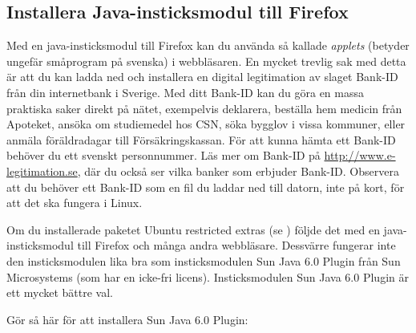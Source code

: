 \documentclass[a4paper,final]{memoir} %
\begin{document}


\subsection{Installera Java-insticksmodul till Firefox}

Med en java-insticksmodul till Firefox kan du använda så kallade \textit{applets} (betyder ungefär småprogram på svenska) i webbläsaren. En mycket trevlig sak med detta är att du kan ladda ned och installera en digital legitimation av slaget Bank-ID från din internetbank i Sverige. Med ditt Bank-ID kan du göra en massa praktiska saker direkt på nätet, exempelvis deklarera, beställa hem medicin från Apoteket, ansöka om studiemedel hos CSN, söka bygglov i vissa kommuner, eller anmäla föräldradagar till Försäkringskassan. För att kunna hämta ett Bank-ID behöver du ett svenskt personnummer. Läs mer om Bank-ID på \url{http://www.e-legitimation.se}, där du också ser vilka banker som erbjuder Bank-ID. Observera att du behöver ett Bank-ID som en fil du laddar ned till datorn, inte på kort, för att det ska fungera i Linux.

Om du installerade paketet Ubuntu restricted extras (se ) följde det med en java-insticksmodul till Firefox och många andra webbläsare. Dessvärre fungerar inte den insticksmodulen lika bra som insticksmodulen Sun Java 6.0 Plugin från Sun Microsystems (som har en icke-fri licens). Insticksmodulen Sun Java 6.0 Plugin är ett mycket bättre val.

Gör så här för att installera Sun Java 6.0 Plugin:
\end{document}
